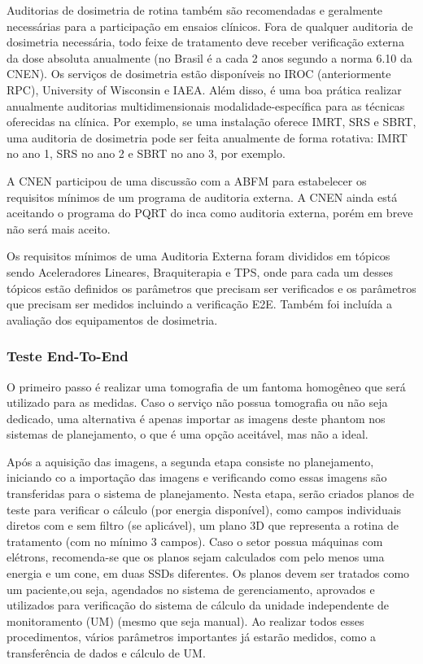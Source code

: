 \documentclass[11pt,a4paper]{article}
\newcounter{exemplo}
\begin{document}
	Auditorias de dosimetria de rotina também são recomendadas e geralmente necessárias para a participação em ensaios clínicos. Fora de qualquer auditoria de dosimetria necessária, todo feixe de tratamento deve receber verificação externa da dose absoluta anualmente (no Brasil é a cada 2 anos segundo a norma 6.10 da CNEN). Os serviços de dosimetria estão disponíveis no IROC (anteriormente RPC), University of Wisconsin e IAEA. Além disso, é uma boa prática realizar anualmente auditorias multidimensionais modalidade-específica para as técnicas oferecidas na clínica. Por exemplo, se uma instalação oferece IMRT, SRS e SBRT, uma auditoria de dosimetria pode ser feita anualmente de forma rotativa: IMRT no ano 1, SRS no ano 2 e SBRT no ano 3, por exemplo.

	A CNEN participou de uma discussão com a ABFM para estabelecer os requisitos mínimos de um programa de auditoria externa. A CNEN ainda está aceitando o programa do PQRT do inca como auditoria externa, porém em breve não será mais aceito. 

	Os requisitos mínimos de uma Auditoria Externa foram divididos em tópicos sendo Aceleradores Lineares, Braquiterapia e TPS, onde para cada um desses tópicos estão definidos os parâmetros que precisam ser verificados e os parâmetros que precisam ser medidos incluindo a verificação E2E. Também foi incluída a avaliação dos equipamentos de dosimetria.

\subsubsection*{Teste End-To-End}

	O primeiro passo é realizar uma tomografia de um fantoma homogêneo que será utilizado para as medidas. Caso o serviço não possua tomografia ou não seja dedicado, uma alternativa é apenas importar as imagens deste phantom nos sistemas de planejamento, o que é uma opção aceitável, mas não a ideal. 
	
	Após a aquisição das imagens, a segunda etapa consiste no planejamento, iniciando co  a importação das imagens e verificando como essas imagens são transferidas para o sistema de planejamento. Nesta etapa, serão criados planos de teste para verificar o cálculo (por energia disponível), como campos individuais diretos com e sem filtro (se aplicável), um plano 3D que representa a rotina de tratamento (com no mínimo 3 campos). Caso o setor possua máquinas com elétrons, recomenda-se que os planos sejam calculados com pelo menos uma energia e um cone, em duas SSDs diferentes. Os planos devem ser tratados como um paciente,ou seja, agendados no sistema de gerenciamento, aprovados e utilizados para verificação do sistema	de cálculo da unidade independente de monitoramento (UM) (mesmo que seja manual). Ao realizar todos esses procedimentos, vários parâmetros importantes já estarão medidos, como a transferência de dados e cálculo de UM.
\end{document}
